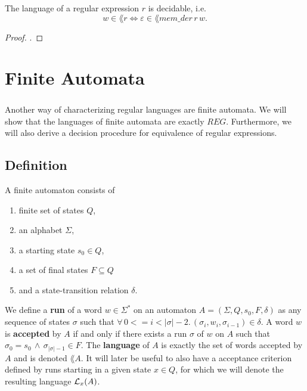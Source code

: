 \documentclass[11pt,a4paper,oneside]{book}
\begin{document}

                \begin{theorem}
                    \label{mem_der_correct} 
                    The language of a regular expression $r$ is decidable, i.e.
                    \[
                        w \in \lang{r} \Leftrightarrow \varepsilon \in \lang{mem\_der \, r \, w}.
                    \]
                \end{theorem}
                \begin{proof}
                    .
                \end{proof}

            

    \chapter{Finite Automata}
        \paragraph{} 
        Another way of characterizing regular languages are finite automata. 
        We will show that the languages of finite automata are exactly $REG$. 
        Furthermore, we will also derive a decision procedure for equivalence of regular expressions.

        \section{Definition}
            A finite automaton consists of
            \begin{enumerate}
                \item
                    finite set of states $Q$, 
                \item 
                    an alphabet $\Sigma$, 
                \item 
                    a starting state $s_0 \in Q$, 
                \item 
                    a set of final states $F \subseteq Q$ 
                \item 
                    and a state-transition relation $\delta$. \cite{DBLP:books/daglib/0011126}
            \end{enumerate}

                We define a \textbf{run} of a word $w \in \Sigma^*$ on an automaton $A = (\Sigma, Q, s_0, F, \delta)$ as any sequence of states $\sigma$ such that 
                $\forall \, 0 <= i < \vert\sigma\vert-2. \, (\sigma_i, w_i, \sigma_{i-1}) \in \delta$.
            A word $w$ is \textbf{accepted} by $A$ if and only if there exists a run $\sigma$ of $w$ on $A$ such that $\sigma_0 = s_0 \, \wedge \, \sigma_{\vert\sigma\vert-1} \in F$.
            The \textbf{language} of $A$ is exactly the set of words accepted by $A$ and is denoted $\lang{A}$. 
            It will later be useful to also have a acceptance criterion defined by runs starting in a given state $x \in Q$, for which we will denote the resulting language $\mathcal{L}_x(A)$.
\end{document}
